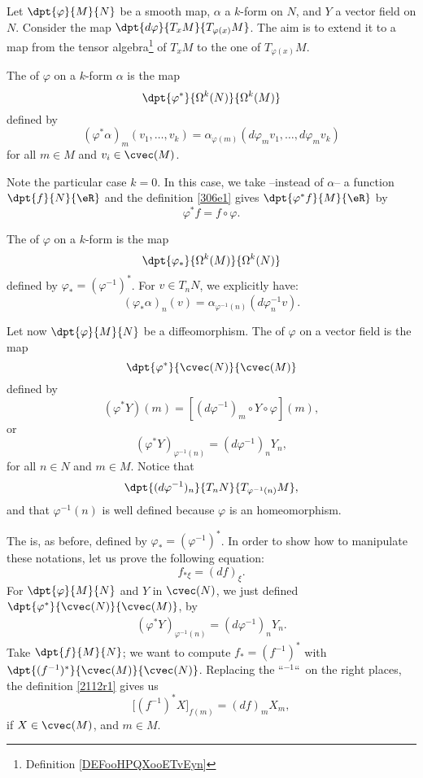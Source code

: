 \begin{normaltext}
Let $\dpt{\varphi}{M}{N}$ be a smooth map, $\alpha$ a $k$-form on $N$, and $Y$ a vector field on $N$. Consider the map $\dpt{d\varphi}{T_xM}{T_{\varphi(x)}M}$. The aim is to extend it to a map from the tensor algebra\footnote{Definition \ref{DEFooHPQXooETvEyn}} of ${T_xM}$ to the one of $T_{\varphi(x)}M$.
\end{normaltext}

The  of $\varphi$ on a $k$-form $\alpha$ is the map
\[
 \dpt{\varphi^*}{\Omega^k(N)}{\Omega^k(M)}
\]
 defined by
\begin{equation}\label{306e1}
 (\varphi^*\alpha)_m(v_1,\ldots,v_k)
 =\alpha_{\varphi(m)}(d\varphi_mv_1,\ldots,d\varphi_mv_k)
\end{equation}
for all $m\in M$ and $v_i\in\cvec(M)$.

Note the particular case $k=0$. In this case, we take --instead of $\alpha$-- a function $\dpt{f}{N}{\eR}$ and the definition \eqref{306e1} gives $\dpt{\varphi^*f}{M}{\eR}$ by
\[
     \varphi^*f=f\circ\varphi.
\]

The  of $\varphi$ on a $k$-form is the map
\[
 \dpt{\varphi_*}{\Omega^k(M)}{\Omega^k(N)}
\]
defined by $\varphi_*=(\varphi^{-1})^*$. For $v\in T_nN$, we explicitly have:
\[
                   (\varphi_*\alpha)_n(v)=\alpha_{\varphi^{-1}(n)}(d\varphi_n^{-1} v).
\]

Let now $\dpt{\varphi}{M}{N}$ be a diffeomorphism. The  of $\varphi$ on a vector field is the map
\[
           \dpt{\varphi^*}{\cvec(N)}{\cvec(M)}
\]
defined by
\[
              (\varphi^*Y)(m)=[(d\varphi^{-1})_m\circ Y\circ\varphi](m),
\]
or
\[
 (\varphi^*Y)_{\varphi^{-1}(n)}=(d\varphi^{-1})_nY_n,
\]
for all $n\in N$ and $m\in M$. Notice that \[\dpt{(d\varphi^{-1})_n}{T_nN}{T_{\varphi^{-1}(n)}M},\] and that  $\varphi^{-1}(n)$ is well defined because $\varphi$ is an homeomorphism.

The  is, as before, defined by $\varphi_*=(\varphi^{-1})^*$. In order to show how to manipulate these notations, let us prove the following equation:
\[
   f_{*\xi}=(df)_{\xi}.
\]
For $\dpt{\varphi}{M}{N}$ and $Y$ in $\cvec(N)$, we just defined $\dpt{\varphi^*}{\cvec(N)}{\cvec(M)}$, by
\begin{eqnarray}
 \label{2112r1}(\varphi^*Y)_{\varphi^{-1}(n)}=(d\varphi^{-1})_nY_n.
\end{eqnarray}
Take $\dpt{f}{M}{N}$; we want to compute $f_*=(f^{-1})^*$ with $\dpt{(f^{-1})^*}{\cvec(M)}{\cvec(N)}$. Replacing the ``$^{-1}$``\ on the right places, the definition \eqref{2112r1} gives us
\[
 \Big[(f^{-1})^*X\Big]_{f(m)}=(df)_mX_m,
\]
if $X\in\cvec(M)$, and $m\in M$.

